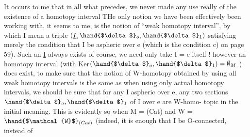  It occurs to me that in all what precedes, we never made any use
really of the existence of a homotopy interval THe only notion we have
been effectively been working with, it seems to me, is the notion of
``weak homotopy interval'', by which I mean a triple $(\underline{I},\hand{$\delta$}_o,\hand{$\delta$}_1)$
satisfying merely the condition that I be aspheric
over e (which is the condition c) on page 59). Such an \underline{I} always exists
of course, we need only take I = e itself !   however an  homotopy
interval (with Ker$(\hand{$\delta$}_o,\hand{$\delta$}_1) = \emptyset_M$ ) does exist, to make sure that the notion
of W-homotopy obtained by using all weak homotopy intervals is the same
as when using only actual homotopy intervals, we should be sure that
for any I aspheric over e, any two sections $\hand{$\delta$}_o,\hand{$\delta$}_1$ of I over e are W-homo-%
topic in the initial meaning. This is evidently so when M = (Cat) and
W = $\hand{$\mathcal{W}$}_{(Cat)}$ (indeed, it is enough that I be O-connected, instead of

